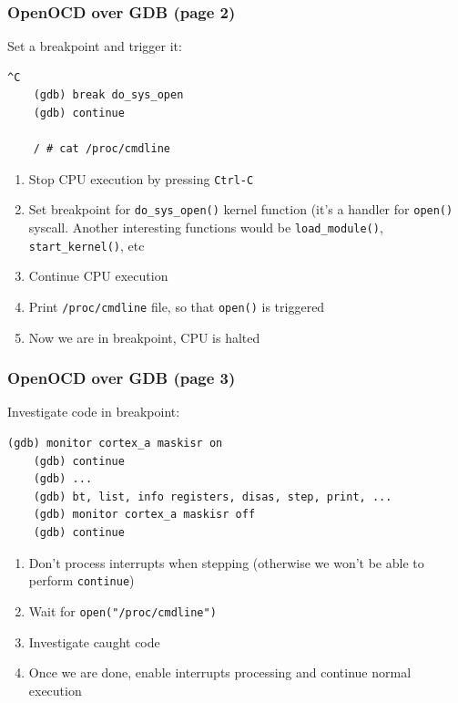 \begin{frame}[containsverbatim]
  \frametitle{OpenOCD over GDB (page 2)}
  \vspace*{-5mm}
  Set a breakpoint and trigger it:
  \begin{lstlisting}[numbers=none]
    ^C
    (gdb) break do_sys_open
    (gdb) continue

    / # cat /proc/cmdline
  \end{lstlisting}
  \begin{enumerate}
    \item Stop CPU execution by pressing \texttt{Ctrl-C}
    \item Set breakpoint for \texttt{do\_sys\_open()} kernel function (it's a
          handler for \texttt{open()} syscall. Another interesting functions
          would be \texttt{load\_module()}, \texttt{start\_kernel()}, etc
    \item Continue CPU execution
    \item Print \texttt{/proc/cmdline} file, so that \texttt{open()} is
          triggered
    \item Now we are in breakpoint, CPU is halted
  \end{enumerate}
  \vspace*{-5mm}
\end{frame}

\begin{frame}[containsverbatim]
  \frametitle{OpenOCD over GDB (page 3)}
  Investigate code in breakpoint:
  \begin{lstlisting}[numbers=none]
    (gdb) monitor cortex_a maskisr on
    (gdb) continue
    (gdb) ...
    (gdb) bt, list, info registers, disas, step, print, ...
    (gdb) monitor cortex_a maskisr off
    (gdb) continue
  \end{lstlisting}
  \begin{enumerate}
    \item Don't process interrupts when stepping (otherwise we won't be
          able to perform \texttt{continue})
    \item Wait for \texttt{open("/proc/cmdline")}
    \item Investigate caught code
    \item Once we are done, enable interrupts processing and continue normal
          execution
  \end{enumerate}
\end{frame}

